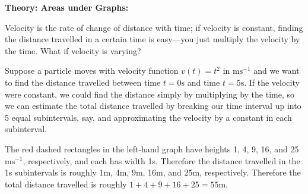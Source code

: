 \documentclass{article}
\begin{document}
\clearpage


{\bf Theory: Areas under Graphs:}

\vspace{5mm}

Velocity is the rate of change of distance with time; if velocity is constant, finding the distance travelled in a certain time is easy---you just multiply the velocity by the time. What if velocity is varying?

Suppose a particle moves with velocity function $v(t)=t^2$ in $\mathrm{ms^{-1}}$ and we want to find the distance travelled between time $t=0\mathrm{s}$ and time $t=5\mathrm{s}$. If the velocity were constant, we could find the distance simply by multiplying by the time, so we can estimate the total distance travelled by breaking our time interval up into 5 equal subintervals, say, and approximating the velocity by a constant in each subinterval.

\begin{center}
\end{center}

The red dashed rectangles in the left-hand graph have heights 1, 4, 9, 16, and 25 $\mathrm{ms}^{-1}$, respectively, and each has width 1s. Therefore the distance travelled in the 1s subintervals is roughly 1m, 4m, 9m, 16m, and 25m, respectively. Therefore the total distance travelled is roughly $1+4+9+16+25=55\mathrm{m}$.
\end{document}
